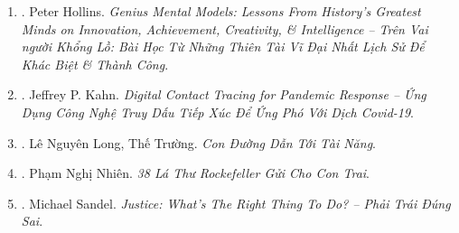 \documentclass{article}
\begin{document}
\begin{enumerate}
	{\sc Peter Hollins} has studied psychology \& peak human performance for over a dozen years. This book represents scientifically proven methods he has used to become an expert in multiple domains.

	Most helpful mental models directly from their sources.
	\begin{itemize}
		\item How {\sc Einstein}'s hobbies helped his genius.
		\item {\sc Napoleon}'s key to conquering nations \& cementing legacy (củng cố di sản).
		\item What {\sc Descartes} had to say about demons.
		\item {\sc Darwin}'s Golden Rule \& how it changed his life.
		\item {\sc Tesla, Edison}, \& battle of approaches \& philosophies.
		\item {\sc Copernicus, Galileo}, \& values of non-convention.
		\item {\sc Sun Tzu}'s imagination of wartime strategies to daily life
		\item {\sc Mozart} \& value of being an empty pitcher to be filled to brim
		\item Unique team that {\sc Abraham Lincoln} surrounded himself with.
	\end{itemize}

	\item \cite{Hollins_genius_mental_models_VN}. {\sc Peter Hollins}. {\it Genius Mental Models: Lessons From History's Greatest Minds on Innovation, Achievement, Creativity, \& Intelligence -- Trên Vai người Khổng Lồ: Bài Học Từ Những Thiên Tài Vĩ Đại Nhất Lịch Sử Để Khác Biệt \& Thành Công}.\hfill{\sf[done]}

	\item \cite{Kahn_diginal_pandemic_VN}. {\sc Jeffrey P. Kahn}. {\it Digital Contact Tracing for Pandemic Response -- Ứng Dụng Công Nghệ Truy Dấu Tiếp Xúc Để Ứng Phó Với Dịch Covid-19}.\hfill{\sf[done]}

	\item \cite{Long_Truong_talent}. {\sc Lê Nguyên Long, Thế Trường}. {\it Con Đường Dẫn Tới Tài Năng}.\hfill{\sf[done]}

	\item \cite{Nhien_Rockefeller}. {\sc Phạm Nghị Nhiên}. {\it 38 Lá Thư Rockefeller Gửi Cho Con Trai}.\hfill{\sf[done]}

	\item \cite{Sandel_justice}. {\sc Michael Sandel}. {\it Justice: What's The Right Thing To Do? -- Phải Trái Đúng Sai}.\hfill{\sf[done]}


\end{enumerate}
\end{document}
